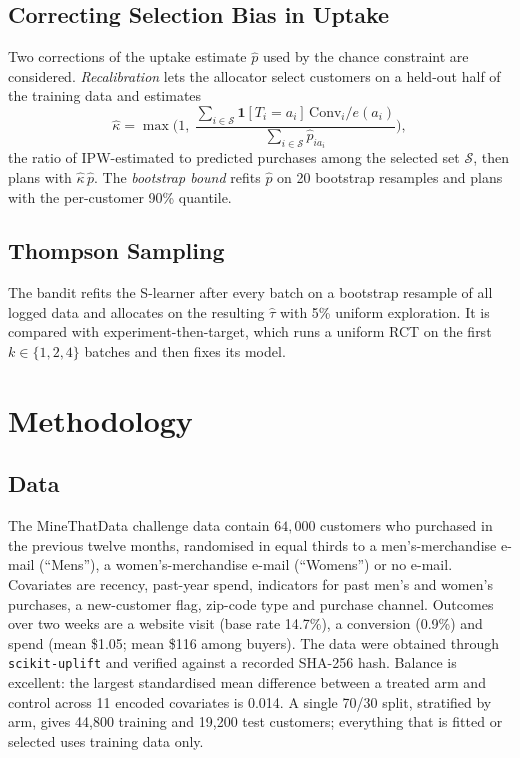 \documentclass[10pt,twocolumn]{article}
\newcommand{\ind}{\mathbf{1}}
\newcommand{\tauh}{\hat{\tau}}
\begin{document}
\subsection{Correcting Selection Bias in Uptake}
Two corrections of the uptake estimate $\hat p$ used by the chance constraint are considered.
\emph{Recalibration} lets the allocator select customers on a held-out half of the training data and
estimates
\begin{equation}
  \hat\kappa = \max\!\Big(1,\ \frac{\sum_{i\in\mathcal S} \ind[T_i=a_i]\,\text{Conv}_i/e(a_i)}
  {\sum_{i\in\mathcal S}\hat p_{i a_i}}\Big),
\end{equation}
the ratio of IPW-estimated to predicted purchases among the selected set $\mathcal S$, then plans
with $\hat\kappa\,\hat p$. The \emph{bootstrap bound} refits $\hat p$ on 20 bootstrap resamples and
plans with the per-customer 90\% quantile.

\subsection{Thompson Sampling}
The bandit refits the S-learner after every batch on a bootstrap resample of all logged data
\citep{thompson1933,eckles2014} and allocates on the resulting $\tauh$ with 5\% uniform exploration.
It is compared with experiment-then-target, which runs a uniform RCT on the first $k\in\{1,2,4\}$
batches and then fixes its model.

\section{Methodology}
\label{sec:method}

\subsection{Data}
The MineThatData challenge data \citep{hillstrom2008} contain $64{,}000$ customers who purchased in
the previous twelve months, randomised in equal thirds to a men's-merchandise e-mail (``Mens''), a
women's-merchandise e-mail (``Womens'') or no e-mail. Covariates are recency, past-year spend,
indicators for past men's and women's purchases, a new-customer flag, zip-code type and purchase
channel. Outcomes over two weeks are a website visit (base rate 14.7\%), a conversion (0.9\%) and
spend (mean \$1.05; mean \$116 among buyers). The data were obtained through \texttt{scikit-uplift}
\citep{sklift} and verified against a recorded SHA-256 hash. Balance is excellent: the largest
standardised mean difference between a treated arm and control across 11 encoded covariates is
0.014. A single 70/30 split, stratified by arm, gives 44{,}800 training and 19{,}200 test customers;
everything that is fitted or selected uses training data only.
\end{document}
